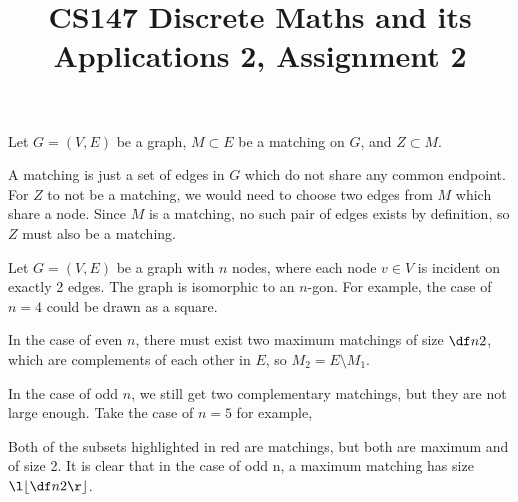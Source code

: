 \documentclass[a4paper]{article}
\title{CS147 Discrete Maths and its Applications 2, Assignment 2}
\begin{document}
\maketitle

\setlength{\parindent}{0em}
\setlength{\parskip}{1em}


Let $G = (V, E)$ be a graph, $M \subset E$ be a matching on $G$, and $Z \subset M$.

A matching is just a set of edges in $G$ which do not share any common endpoint. For $Z$ to not be a matching, we would need to choose two edges from $M$ which share a node. Since $M$ is a matching, no such pair of edges exists by definition, so $Z$ must also be a matching.



Let $G = (V, E)$ be a graph with $n$ nodes, where each node $v \in V$ is incident on exactly 2 edges.
The graph is isomorphic to an $n$-gon. For example, the case of $n=4$ could be drawn as a square.

In the case of even $n$, there must exist two maximum matchings of size $\df n2$, which are complements of each other in $E$, so $M_2 = E \setminus M_1$.

In the case of odd $n$, we still get two complementary matchings, but they are not large enough. Take the case of $n=5$ for example,

\begin{center}
\end{center}

Both of the subsets highlighted in red are matchings, but both are maximum and of size 2. It is clear that in the case of odd n, a maximum matching has size $\l\lfloor \df n2 \r\rfloor$.
\end{document}
